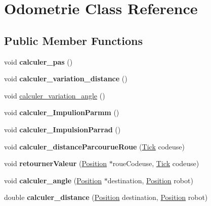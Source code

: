 \hypertarget{class_odometrie}{}\section{Odometrie Class Reference}
\label{class_odometrie}
\subsection*{Public Member Functions}
\begin{DoxyCompactItemize}
\item 
void {\bfseries calculer\+\_\+pas} ()\hypertarget{class_odometrie_ae68ca6d28bf47ec2c1835714a9839456}{}\label{class_odometrie_ae68ca6d28bf47ec2c1835714a9839456}

\item 
void {\bfseries calculer\+\_\+variation\+\_\+distance} ()\hypertarget{class_odometrie_ab4689aa19bfc65ff5d0704d65ea41e0e}{}\label{class_odometrie_ab4689aa19bfc65ff5d0704d65ea41e0e}

\item 
void \hyperlink{class_odometrie_a6900512580f5347a37c4cb8b5fd93043}{calculer\+\_\+variation\+\_\+angle} ()
\item 
void {\bfseries calculer\+\_\+\+Impulion\+Parmm} ()\hypertarget{class_odometrie_a3777f956fc5f4d0e5087cc873b4c6147}{}\label{class_odometrie_a3777f956fc5f4d0e5087cc873b4c6147}

\item 
void {\bfseries calculer\+\_\+\+Impulsion\+Parrad} ()\hypertarget{class_odometrie_ac0661c3b98db0e45c096d11181ecb983}{}\label{class_odometrie_ac0661c3b98db0e45c096d11181ecb983}

\item 
void {\bfseries calculer\+\_\+distance\+Parcourue\+Roue} (\hyperlink{struct_tick}{Tick} codeuse)\hypertarget{class_odometrie_aa9f3987c74ae16c6bb73475f6fa995d5}{}\label{class_odometrie_aa9f3987c74ae16c6bb73475f6fa995d5}

\item 
void {\bfseries retourner\+Valeur} (\hyperlink{struct_position}{Position} $\ast$roue\+Codeuse, \hyperlink{struct_tick}{Tick} codeuse)\hypertarget{class_odometrie_a8b9266574fce4de4131421053e8fa73b}{}\label{class_odometrie_a8b9266574fce4de4131421053e8fa73b}

\item 
void {\bfseries calculer\+\_\+angle} (\hyperlink{struct_position}{Position} $\ast$destination, \hyperlink{struct_position}{Position} robot)\hypertarget{class_odometrie_a45bd260006f6f5e4596814c80c578025}{}\label{class_odometrie_a45bd260006f6f5e4596814c80c578025}

\item 
double {\bfseries calculer\+\_\+distance} (\hyperlink{struct_position}{Position} destination, \hyperlink{struct_position}{Position} robot)\hypertarget{class_odometrie_a49c4d594d1280d18302ad3274a732118}{}\label{class_odometrie_a49c4d594d1280d18302ad3274a732118}

\end{DoxyCompactItemize}



